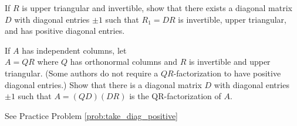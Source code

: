 \documentclass{ximera}
\begin{document}






\begin{problem}\label{prob:take_diag_positive}
If $R$ is upper triangular and invertible, show that there exists a diagonal matrix $D$ with diagonal entries $\pm 1$ such that $R_{1} = DR$ is invertible, upper triangular, and has positive diagonal entries.
\end{problem}

\begin{problem}\label{prob:fullQR}
If $A$ has independent columns, let \\ $A = QR$ where $Q$ has orthonormal columns and $R$ is invertible and upper triangular. (Some authors do not require a $QR$-factorization to have positive diagonal entries.) Show that there is a diagonal matrix $D$ with diagonal entries $\pm 1$ such that $A = (QD)(DR)$ is the QR-factorization of $A$.
\begin{hint}
See Practice Problem \ref{prob:take_diag_positive}
\end{hint}
\end{problem}
\end{document}
